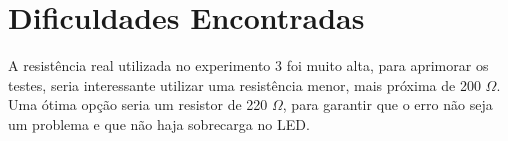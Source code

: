 \documentclass[a4paper,oneside,10pt]{article}
\begin{document}
\section{Dificuldades Encontradas}

A resistência real utilizada no experimento 3 foi muito alta, para aprimorar os testes, seria interessante utilizar uma resistência menor, mais próxima de 200 $\Omega$. Uma ótima opção seria um resistor de 220 $\Omega$, para garantir que o erro não seja um problema e que não haja sobrecarga no LED.


\end{document}
